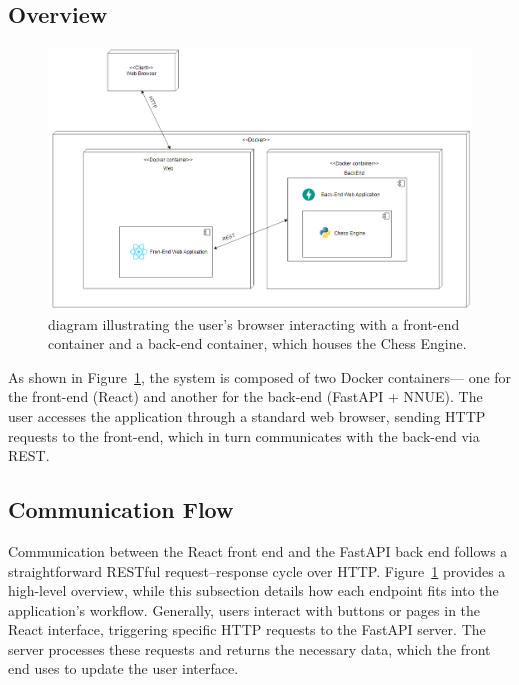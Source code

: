\documentclass[12pt,a4paper]{article}
\begin{document}
\subsection{Overview}
\begin{figure}[H]
    \centering
    \includegraphics[width=1\textwidth]{figures/diagram1.png}  %
    \caption{diagram illustrating the user’s browser interacting with 
    a front-end container and a back-end container, which houses the Chess Engine.}
    \label{fig:system-architecture}
\end{figure}

As shown in Figure~\ref{fig:system-architecture}, the system is composed of two Docker containers—
one for the front-end (React) and another for the back-end (FastAPI + NNUE). The user accesses 
the application through a standard web browser, sending HTTP requests to the front-end, which 
in turn communicates with the back-end via REST.




\subsection{Communication Flow}
Communication between the React front end and the FastAPI back end follows a straightforward RESTful request--response cycle over HTTP. Figure~\ref{fig:system-architecture} provides a high-level overview, while this subsection details how each endpoint fits into the application's workflow. Generally, users interact with buttons or pages in the React interface, triggering specific HTTP requests to the FastAPI server. The server processes these requests and returns the necessary data, which the front end uses to update the user interface.
\end{document}
